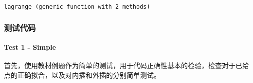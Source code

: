 \documentclass[11pt]{article}
\makeatletter
\newcommand{\boxspacing}{\kern\kvtcb@left@rule\kern\kvtcb@boxsep}
\newcommand{\prompt}[4]{
        {\ttfamily\llap{{\color{#2}[#3]:\hspace{3pt}#4}}\vspace{-\baselineskip}}
    }
\makeatother
\begin{document}
            \begin{tcolorbox}[breakable, size=fbox, boxrule=.5pt, pad at break*=1mm, opacityfill=0]
\prompt{Out}{outcolor}{37}{\boxspacing}
\begin{Verbatim}[commandchars=\\\{\}]
lagrange (generic function with 2 methods)
\end{Verbatim}
\end{tcolorbox}
        
    \hypertarget{ux6d4bux8bd5ux4ee3ux7801}{%
\subsubsection{测试代码}\label{ux6d4bux8bd5ux4ee3ux7801}}

    \hypertarget{test-1---simple}{%
\paragraph{Test 1 - Simple}\label{test-1---simple}}

首先，使用教材例题作为简单的测试，用于代码正确性基本的检验，检查对于已给点的正确拟合，以及对内插和外插的分别简单测试。
\end{document}
